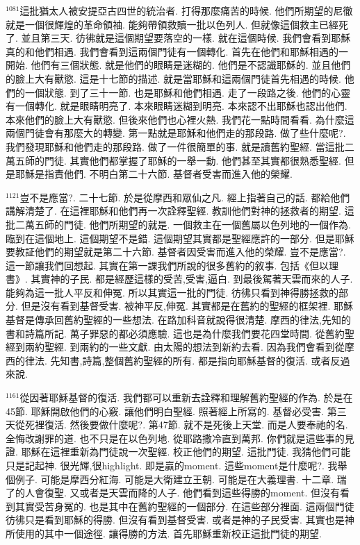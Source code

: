 \documentclass{book}
\begin{document}
$^{1081}$這批猶太人被安提亞古四世的統治者.
打得那麼痛苦的時候.
他們所期望的尼徹就是一個很輝煌的革命領袖.
能夠帶領救贖一批以色列人.
但就像這個救主已經死了.
並且第三天.
彷彿就是這個期望要落空的一樣.
就在這個時候.
我們會看到耶穌真的和他們相遇.
我們會看到這兩個門徒有一個轉化.
首先在他們和耶穌相遇的一開始.
他們有三個狀態.
就是他們的眼睛是迷糊的.
他們是不認識耶穌的.
並且他們的臉上大有獸慾.
這是十七節的描述.
就是當耶穌和這兩個門徒首先相遇的時候.
他們的一個狀態.
到了三十一節.
也是耶穌和他們相遇.
走了一段路之後.
他們的心靈有一個轉化.
就是眼睛明亮了.
本來眼睛迷糊到明亮.
本來認不出耶穌也認出他們.
本來他們的臉上大有獸慾.
但後來他們也心裡火熱.
我們花一點時間看看.
為什麼這兩個門徒會有那麼大的轉變.
第一點就是耶穌和他們走的那段路.
做了些什麼呢?.
我們發現耶穌和他們走的那段路.
做了一件很簡單的事.
就是讀舊約聖經.
當這批二萬五師的門徒.
其實他們都掌握了耶穌的一舉一動.
他們甚至其實都很熟悉聖經.
但是耶穌是指責他們.
不明白第二十六節.
基督者受害而進入他的榮耀.

$^{1121}$豈不是應當?.
二十七節.
於是從摩西和眾仙之凡.
經上指著自己的話.
都給他們講解清楚了.
在這裡耶穌和他們再一次詮釋聖經.
教訓他們對神的拯救者的期望.
這批二萬五師的門徒.
他們所期望的就是.
一個救主在一個舊屬以色列地的一個作為.
臨到在這個地上.
這個期望不是錯.
這個期望其實都是聖經應許的一部分.
但是耶穌要教証他們的期望就是第二十六節.
基督者因受害而進入他的榮耀.
豈不是應當?.
這一節讓我們回想起.
其實在第一課我們所說的很多舊約的敘事.
包括《但以理書》.
其實神的子民.
都是經歷這樣的受苦,受害,逼白.
到最後駕著天雲而來的人子.
能夠為這一批人平反和伸冤.
所以其實這一批的門徒.
彷彿只看到神得勝拯救的部分.
但是沒有看到基督受害.
被神平反,伸冤.
其實都是在舊約的聖經的框架裡.
耶穌基督是傳承回舊約聖經的一些想法.
在路加科音就說得很清楚.
摩西的律法,先知的書和詩篇所記.
萬子罪惡的都必須應驗.
這也是為什麼我們要花四堂時間.
從舊約聖經到兩約聖經.
到兩約的一些文獻.
由太陽的想法到新約去看.
因為我們會看到從摩西的律法.
先知書,詩篇,整個舊約聖經的所有.
都是指向耶穌基督的復活.
或者反過來說.

$^{1161}$從因著耶穌基督的復活.
我們都可以重新去詮釋和理解舊約聖經的作為.
於是在45節.
耶穌開啟他們的心竅.
讓他們明白聖經.
照著經上所寫的.
基督必受害.
第三天從死裡復活.
然後要做什麼呢?.
第47節.
就不是死後上天堂.
而是人要奉祂的名.
全悔改謝罪的道.
也不只是在以色列地.
從耶路撒冷直到萬邦.
你們就是這些事的見證.
耶穌在這裡重新為門徒說一次聖經.
校正他們的期望.
這批門徒.
我猜他們可能只是記起神.
很光輝,很highlight.
即是贏的moment.
這些moment是什麼呢?.
我舉個例子.
可能是摩西分紅海.
可能是大衛建立王朝.
可能是在大義理書.
十二章.
瑞了的人會復聖.
又或者是天雲而降的人子.
他們看到這些得勝的moment.
但沒有看到其實受苦身冤的.
也是其中在舊約聖經的一個部分.
在這些部分裡面.
這兩個門徒彷彿只是看到耶穌的得勝.
但沒有看到基督受害.
或者是神的子民受害.
其實也是神所使用的其中一個途徑.
讓得勝的方法.
首先耶穌重新校正這批門徒的期望.
\end{document}
